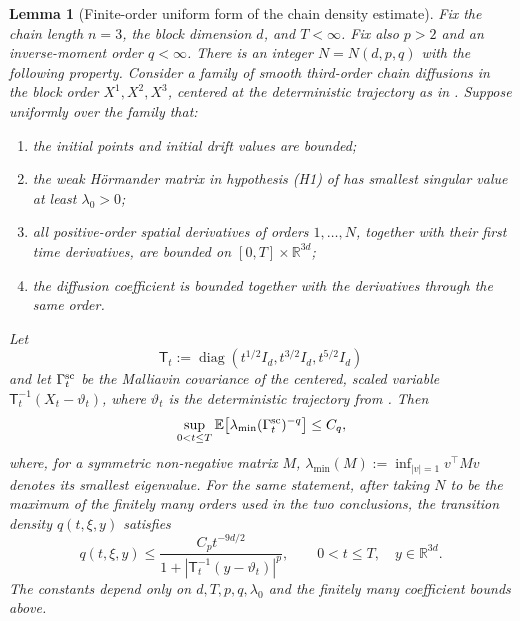 \documentclass[11pt]{article}
\numberwithin{equation}{section}
\theoremstyle{plain}
\newtheorem{lemma}[theorem]{Lemma}
\theoremstyle{definition}
\theoremstyle{remark}
\newcommand{\R}{\mathbb R}
\newcommand{\E}{\mathbb E}
\begin{document}
\begin{lemma}[Finite-order uniform form of the chain density estimate]
\label{lem:finite-order-pigato}
Fix the chain length $n=3$, the block dimension $d$, and $T<\infty$.
Fix also $p>2$ and an inverse-moment order $q<\infty$.  There is an integer
$N=N(d,p,q)$ with the following property.  Consider a family of smooth
third-order chain diffusions in the block order
$X^1,X^2,X^3$, centered at the deterministic trajectory as in
\cite[(D2)]{Pigato2022}.  Suppose uniformly over the family that:
\begin{enumerate}[label=\textup{(P\arabic*)},leftmargin=2.6em]
\item the initial points and initial drift values are bounded;
\item the weak H\"ormander matrix in hypothesis \textup{(H1)} of
\cite{Pigato2022} has smallest singular value at least $\lambda_0>0$;
\item all positive-order spatial derivatives of orders $1,\ldots,N$, together
with their first time derivatives, are bounded on
$[0,T]\times\R^{3d}$;
\item the diffusion coefficient is bounded together with the derivatives
through the same order.
\end{enumerate}
Let
\[
\mathsf T_t
:=\operatorname{diag}\left(t^{1/2}I_d,t^{3/2}I_d,t^{5/2}I_d\right)
\]
and let $\Gamma_t^{\rm sc}$ be the Malliavin covariance of the centered,
scaled variable $\mathsf T_t^{-1}(X_t-\vartheta_t)$, where
$\vartheta_t$ is the deterministic trajectory from \cite[(D2)]{Pigato2022}.
Then
\begin{equation}
\label{eq:finite-order-pigato-inverse}
\sup_{0<t\le T}\E\!\left[
\lambda_{\min}(\Gamma_t^{\rm sc})^{-q}\right]\le C_q,
\end{equation}
where, for a symmetric non-negative matrix $M$,
$\lambda_{\min}(M):=\inf_{|v|=1}v^\top Mv$
denotes its smallest eigenvalue.
For the same statement, after taking $N$ to be the maximum of the finitely
many orders used in the two conclusions, the transition density
$q(t,\xi,y)$
satisfies
\begin{equation}
\label{eq:finite-order-pigato-density}
q(t,\xi,y)
\le
\frac{C_p t^{-9d/2}}
{1+|\mathsf T_t^{-1}(y-\vartheta_t)|^p},
\qquad 0<t\le T,\quad y\in\R^{3d}.
\end{equation}
The constants depend only on
$d,T,p,q,\lambda_0$ and the finitely many coefficient bounds above.
\end{lemma}
\end{document}
